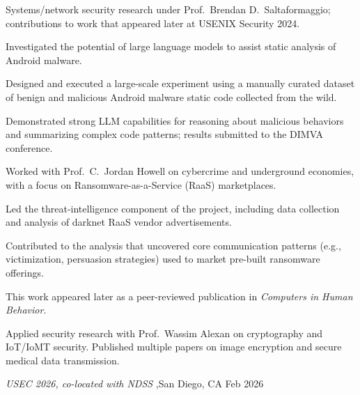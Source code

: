 \documentclass[letterpaper,10pt]{article}
\begin{document}
\begin{bullets}
  \item Systems/network security research under Prof.\ Brendan D.\ Saltaformaggio; contributions to work that appeared later at USENIX Security 2024.
  \item Investigated the potential of large language models to assist static analysis of Android malware.
  \item Designed and executed a large-scale experiment using a manually curated dataset of benign and malicious Android malware static code collected from the wild.
  \item Demonstrated strong LLM capabilities for reasoning about malicious behaviors and summarizing complex code patterns; results submitted to the DIMVA conference.
\end{bullets}

\begin{bullets}
  \item Worked with Prof.\ C.\ Jordan Howell on cybercrime and underground economies, with a focus on Ransomware-as-a-Service (RaaS) marketplaces.
  \item Led the threat-intelligence component of the project, including data collection and analysis of darknet RaaS vendor advertisements.
  \item Contributed to the analysis that uncovered core communication patterns (e.g., victimization, persuasion strategies) used to market pre-built ransomware offerings.
  \item This work appeared later as a peer-reviewed publication in \textit{Computers in Human Behavior}.
\end{bullets}

\begin{bullets}
  \item Applied security research with Prof.\ Wassim Alexan on cryptography and IoT/IoMT security. Published multiple papers on image encryption and secure medical data transmission.
\end{bullets}


  {\textit{USEC 2026, co-located with NDSS} \sep San Diego, CA}
  {Feb 2026}
\end{document}
